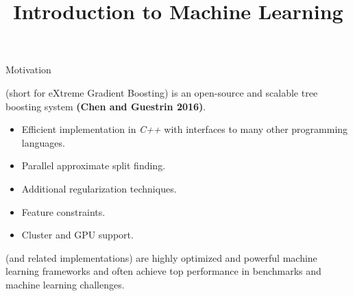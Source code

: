 






\newcommand{\titlefigure}{figure_man/split-finding02.png}
\newcommand{\learninggoals}{
  \item \textcolor{blue}{XXX}
  \item \textcolor{blue}{XXX}
}

\title{Introduction to Machine Learning}
\date{}





\begin{vbframe}{Motivation}

 (short for eXtreme Gradient Boosting) is an open-source and scalable tree boosting system \textbf{(Chen and Guestrin 2016)}.

\lz

\begin{itemize}
  \item Efficient implementation in \emph{C++} with interfaces to many other programming languages.
  \item Parallel approximate split finding.
  \item Additional regularization techniques.
  \item Feature constraints.
  \item Cluster and GPU support.
\end{itemize}

\lz

 (and related implementations) are highly optimized and powerful machine learning frameworks and often achieve top performance in benchmarks and machine learning challenges.


\end{vbframe}

